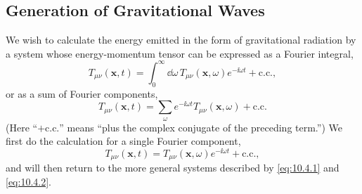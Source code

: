 
\subsection{Generation of Gravitational Waves}\label{sec:10.4}

We wish to calculate the energy emitted in the form of gravitational
radiation by a system whose energy-momentum tensor can be expressed as a
Fourier integral,
\begin{equation}
  T_{\mu\nu}(\mathbf{x},t)
  =
  \int_0^\infty \dd\omega\,
  T_{\mu\nu}(\mathbf{x},\omega)e^{-\ii\omega t}
  +\text{c.c.},
  \tag{10.4.1}\label{eq:10.4.1}
\end{equation}
or as a sum of Fourier components,
\begin{equation}
  T_{\mu\nu}(\mathbf{x},t)
  =
  \sum_\omega e^{-\ii\omega t}T_{\mu\nu}(\mathbf{x},\omega)
  +\text{c.c.}
  \tag{10.4.2}\label{eq:10.4.2}
\end{equation}
(Here ``\( +\text{c.c.}\)'' means ``plus the complex conjugate of the
preceding term.'') We first do the calculation for a single Fourier
component,
\begin{equation}
  T_{\mu\nu}(\mathbf{x},t)
  =
  T_{\mu\nu}(\mathbf{x},\omega)e^{-\ii\omega t}
  +\text{c.c.},
  \tag{10.4.3}\label{eq:10.4.3}
\end{equation}
and will then return to the more general systems described by
\eqref{eq:10.4.1} and \eqref{eq:10.4.2}.

